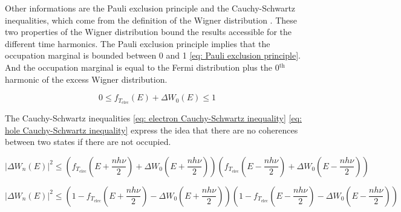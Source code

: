 Other informations are the Pauli exclusion principle and the Cauchy-Schwartz inequalities, which come from the definition of the Wigner distribution \cite{ferraro2013wigner}.
These two properties of the Wigner distribution bound the results accessible for the different time harmonics.
The Pauli exclusion principle implies that the occupation marginal is bounded between 0 and 1 \eqref{eq: Pauli exclusion principle}.
And the occupation marginal is equal to the Fermi distribution plus the 0$^{\mathrm{th}}$harmonic of the excess Wigner distribution.

\begin{equation}
0 \leq f_{T_{\mathrm{elec}}}\left(E\right)+\Delta W_{0}\left(E\right) \leq 1 \label{eq: Pauli exclusion principle}
\end{equation}

The Cauchy-Schwartz inequalities \eqref{eq: electron Cauchy-Schwartz inequality} \eqref{eq: hole Cauchy-Schwartz inequality} express the idea that there are no coherences between two states if there are not occupied.

\begin{equation}
\left|\Delta W_{n}\left(E\right)\right|^{2} \leq \left(f_{T_{\mathrm{elec}}}\left(E+\frac{nh\nu}{2}\right)+\Delta W_{0}\left(E+\frac{nh\nu}{2}\right)\right)\left(f_{T_{\mathrm{elec}}}\left(E-\frac{nh\nu}{2}\right)+\Delta W_{0}\left(E-\frac{nh\nu}{2}\right)\right) \label{eq: electron Cauchy-Schwartz inequality}
\end{equation}

\begin{equation}
\left|\Delta W_{n}\left(E\right)\right|^{2} \leq \left(1-f_{T_{\mathrm{elec}}}\left(E+\frac{nh\nu}{2}\right)-\Delta W_{0}\left(E+\frac{nh\nu}{2}\right)\right)\left(1-f_{T_{\mathrm{elec}}}\left(E-\frac{nh\nu}{2}\right)-\Delta W_{0}\left(E-\frac{nh\nu}{2}\right)\right) \label{eq: hole Cauchy-Schwartz inequality}
\end{equation}

